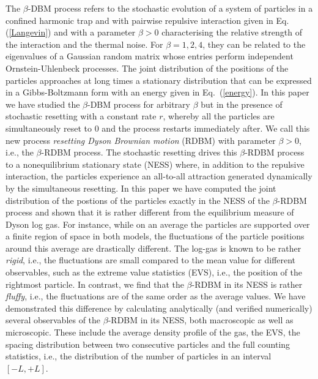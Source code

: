 \documentclass[onecolumn,superscriptaddress,
 amsmath,amssymb,
 aps,
 prd,
]{revtex4-1}
\begin{document}
The $\beta$-DBM process refers to the stochastic evolution of a system of particles in a confined harmonic trap and with pairwise repulsive
interaction given in Eq. (\ref{Langevin}) and with a parameter $\beta>0$ characterising the relative strength of the interaction and the thermal noise. 
For $\beta = 1,2,4$, they can be related to the eigenvalues of a Gaussian random matrix whose entries perform independent Ornstein-Uhlenbeck processes.  
The joint distribution of the positions of the particles approaches at long times a stationary distribution that can be 
expressed in a Gibbs-Boltzmann form with an energy given in Eq.~(\ref{energy}). In this paper we have studied the $\beta$-DBM process for arbitrary $\beta$ but in the presence of stochastic resetting with a constant rate $r$, whereby
all the particles are simultaneously reset to $0$ and the process restarts immediately after. We call this new process {\it resetting Dyson Brownian motion} (RDBM) with parameter $\beta > 0$, i.e., the $\beta$-RDBM process. The stochastic resetting drives this $\beta$-RDBM process to a nonequilibrium stationary state (NESS) where, in addition to the repulsive interaction, the particles experience an all-to-all attraction generated dynamically by the simultaneous resetting. In this paper we have computed the joint distribution of the postions of the particles exactly in the NESS of the $\beta$-RDBM process and shown that it is rather different from the equilibrium measure of Dyson log gas. For instance, while on an average the particles are supported over a finite region of space in both models,
the fluctuations of the particle positions around this average are drastically different. The log-gas is known to be rather {\it rigid}, i.e., the fluctuations are small compared to the mean value for different observables, such as the extreme value statistics (EVS), i.e., the position of the rightmost particle. In contrast, we find that the $\beta$-RDBM in its NESS is rather {\it fluffy}, i.e., the fluctuations are of the same order as the average values. We have demonstrated this difference by calculating analytically (and verified numerically) several observables of the $\beta$-RDBM in its NESS, both macroscopic as well as microscopic. These include the average density profile of the gas, the EVS, the spacing distribution between two consecutive particles and the full counting statistics, i.e., the distribution of the number of particles in an interval $[-L,+L]$. 
 
\end{document}

